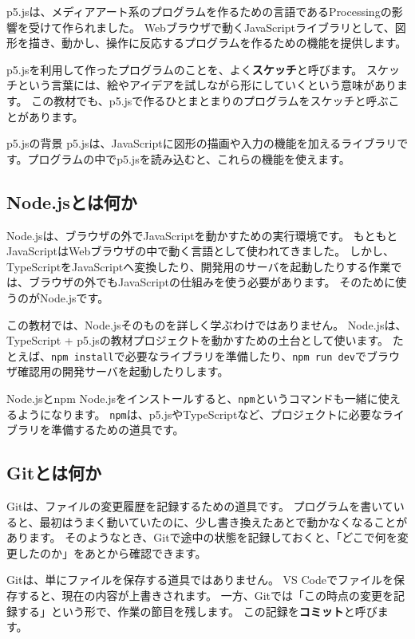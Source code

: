 p5.jsは、メディアアート系のプログラムを作るための言語であるProcessingの影響を受けて作られました。
Webブラウザで動くJavaScriptライブラリとして、図形を描き、動かし、操作に反応するプログラムを作るための機能を提供します。

p5.jsを利用して作ったプログラムのことを、よく\textbf{スケッチ}と呼びます。
スケッチという言葉には、絵やアイデアを試しながら形にしていくという意味があります。
この教材でも、p5.jsで作るひとまとまりのプログラムをスケッチと呼ぶことがあります。

\begin{pointbox}{p5.jsの背景}
p5.jsは、JavaScriptに図形の描画や入力の機能を加えるライブラリです。プログラムの中でp5.jsを読み込むと、これらの機能を使えます。
\end{pointbox}

\subsection{Node.jsとは何か}

Node.jsは、ブラウザの外でJavaScriptを動かすための実行環境です。
もともとJavaScriptはWebブラウザの中で動く言語として使われてきました。
しかし、TypeScriptをJavaScriptへ変換したり、開発用のサーバを起動したりする作業では、ブラウザの外でもJavaScriptの仕組みを使う必要があります。
そのために使うのがNode.jsです。

この教材では、Node.jsそのものを詳しく学ぶわけではありません。
Node.jsは、TypeScript + p5.jsの教材プロジェクトを動かすための土台として使います。
たとえば、\texttt{npm install}で必要なライブラリを準備したり、\texttt{npm run dev}でブラウザ確認用の開発サーバを起動したりします。

\begin{pointbox}{Node.jsとnpm}
Node.jsをインストールすると、\texttt{npm}というコマンドも一緒に使えるようになります。
\texttt{npm}は、p5.jsやTypeScriptなど、プロジェクトに必要なライブラリを準備するための道具です。
\end{pointbox}

\subsection{Gitとは何か}

Gitは、ファイルの変更履歴を記録するための道具です。
プログラムを書いていると、最初はうまく動いていたのに、少し書き換えたあとで動かなくなることがあります。
そのようなとき、Gitで途中の状態を記録しておくと、「どこで何を変更したのか」をあとから確認できます。

Gitは、単にファイルを保存する道具ではありません。
VS Codeでファイルを保存すると、現在の内容が上書きされます。
一方、Gitでは「この時点の変更を記録する」という形で、作業の節目を残します。
この記録を\textbf{コミット}と呼びます。

